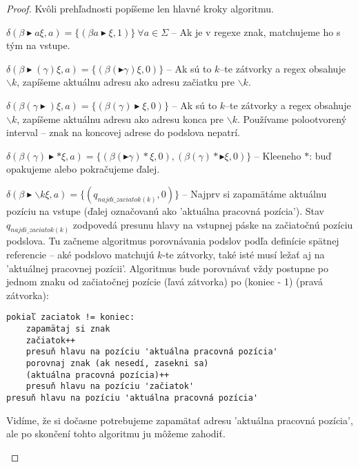 \begin{proof}
Kvôli prehľadnosti popíšeme len hlavné kroky algoritmu. 
\begin{list}{}{}
\item $\delta(\beta\blacktriangleright a \xi, a) = \lbrace (\beta a \blacktriangleright \xi, 1) \rbrace ~ \forall a \in \Sigma$ -- Ak je v regexe znak, matchujeme ho s tým na vstupe.
\item $\delta(\beta\blacktriangleright(\gamma)\xi, a) = \lbrace (\beta(\blacktriangleright\gamma)\xi, 0) \rbrace$ -- Ak sú to $k$--te zátvorky a regex obsahuje $\backslash k$, zapíšeme aktuálnu adresu ako adresu začiatku pre $\backslash k$.
\item $\delta(\beta(\gamma\blacktriangleright)\xi, a) = \lbrace (\beta(\gamma)\blacktriangleright\xi, 0) \rbrace$ -- Ak sú to $k$--te zátvorky a regex obsahuje $\backslash k$, zapíšeme aktuálnu adresu ako adresu konca pre $\backslash k$. Používame polootvorený interval -- znak na koncovej adrese do podslova nepatrí.
\item $\delta(\beta(\gamma)\blacktriangleright * \xi, a) = \lbrace (\beta(\blacktriangleright\gamma)*\xi, 0),(\beta(\gamma)*\blacktriangleright\xi, 0) \rbrace$ -- Kleeneho $*$: buď opakujeme alebo pokračujeme ďalej.
\item $\delta(\beta\blacktriangleright\backslash k \xi, a) = \lbrace (q_{najdi\_zaciatok(k)}, 0) \rbrace$ -- Najprv si zapamätáme aktuálnu pozíciu na vstupe (ďalej označovanú ako 'aktuálna pracovná pozícia'). Stav $q_{najdi\_zaciatok(k)}$ zodpovedá presunu hlavy na vstupnej páske na začiatočnú pozíciu podslova. Tu začneme algoritmus porovnávania podslov podľa definície spätnej referencie -- aké podslovo matchujú $k$-te zátvorky, také isté musí ležať aj na 'aktuálnej pracovnej pozícii'. Algoritmus bude porovnávať vždy postupne po jednom znaku od začiatočnej pozície (ľavá zátvorka) po (koniec - 1) (pravá zátvorka):

\begin{verbatim}
pokiaľ zaciatok != koniec: 
    zapamätaj si znak 
    začiatok++ 
    presuň hlavu na pozíciu 'aktuálna pracovná pozícia' 
    porovnaj znak (ak nesedí, zasekni sa) 
    (aktuálna pracovná pozícia)++ 
    presuň hlavu na pozíciu 'začiatok' 
presuň hlavu na pozíciu 'aktuálna pracovná pozícia'
\end{verbatim}
Vidíme, že si dočasne potrebujeme zapamätať adresu 'aktuálna pracovná pozícia', ale po skončení tohto algoritmu ju môžeme zahodiť.


\end{list}
\end{proof}
